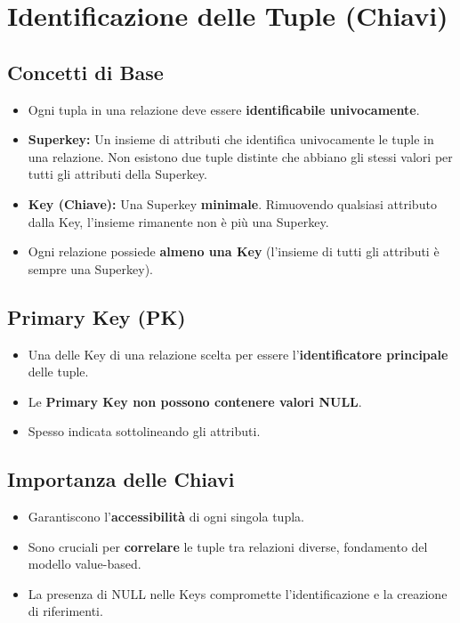 \documentclass{article}
\begin{document}
	\section{Identificazione delle Tuple (Chiavi)}
	
	\subsection{Concetti di Base}
	\begin{itemize}
		\item Ogni tupla in una relazione deve essere \textbf{identificabile univocamente}.
		\item \textbf{Superkey:} Un insieme di attributi che identifica univocamente le tuple in una relazione. Non esistono due tuple distinte che abbiano gli stessi valori per tutti gli attributi della Superkey.
		\item \textbf{Key (Chiave):} Una Superkey \textbf{minimale}. Rimuovendo qualsiasi attributo dalla Key, l'insieme rimanente non è più una Superkey.
		\item Ogni relazione possiede \textbf{almeno una Key} (l'insieme di tutti gli attributi è sempre una Superkey).
	\end{itemize}
	
	\subsection{Primary Key (PK)}
	\begin{itemize}
		\item Una delle Key di una relazione scelta per essere l'\textbf{identificatore principale} delle tuple.
		\item Le \textbf{Primary Key non possono contenere valori NULL}.
		\item Spesso indicata sottolineando gli attributi.
	\end{itemize}
	
	\subsection{Importanza delle Chiavi}
	\begin{itemize}
		\item Garantiscono l'\textbf{accessibilità} di ogni singola tupla.
		\item Sono cruciali per \textbf{correlare} le tuple tra relazioni diverse, fondamento del modello value-based.
		\item La presenza di NULL nelle Keys compromette l'identificazione e la creazione di riferimenti.
	\end{itemize}
	
\end{document}

